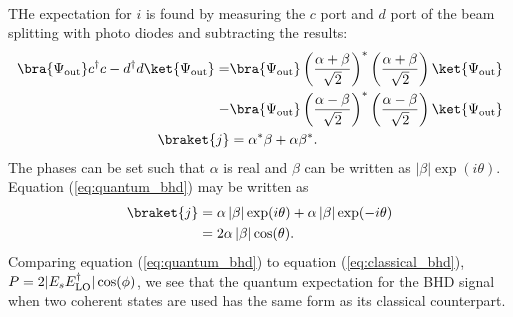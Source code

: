 \paragraph{}
THe expectation for $i$ is found by measuring the $c$ port and $d$ port of the beam splitting with photo diodes and subtracting the results:
\begin{align}
\bra{\Psi_{\rm{out}}}c^\dagger c - d^\dagger d\ket{\Psi_{\rm{out}}} = &\bra{\Psi_{\rm{out}}} \left(\frac{\alpha + \beta}{\sqrt{2}} \right)^*\left(\frac{\alpha + \beta}{\sqrt{2}} \right)\ket{\Psi_{\rm{out}}}\\ - &\bra{\Psi_{\rm{out}}} \left(\frac{\alpha - \beta}{\sqrt{2}} \right)^*\left(\frac{\alpha - \beta}{\sqrt{2}} \right)\ket{\Psi_{\rm{out}}}\\
\braket{j} & =\alpha^*\beta + \alpha\beta^*.
\label{eq:quantum_bhd}
\end{align}
The phases can be set such that $\alpha$ is real and $\beta$ can be written as $\left|\beta\right|\exp(i\theta)$. Equation (\ref{eq:quantum_bhd}) may be written as 
\begin{align}
\braket{j}  &=\alpha\left|\beta\right|\exp(i\theta) + \alpha\left|\beta\right|\exp(-i\theta)\\
&= 2\alpha\left|\beta\right|\cos(\theta).
\end{align}
Comparing equation (\ref{eq:quantum_bhd}) to equation (\ref{eq:classical_bhd}), $P = 2|E_sE^\dagger_{\rm{LO}}|\cos(\phi)$, we see that the quantum expectation for the BHD signal when two coherent states are used has the same form as its classical counterpart.
